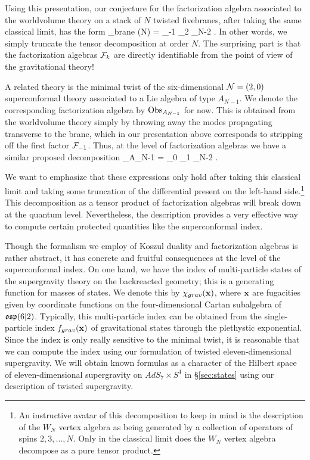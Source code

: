 Using this presentation, our conjecture for the factorization algebra associated to the worldvolume theory on a stack of $N$ twisted fivebranes, after taking the same classical limit, has the form
\beqn\label{eqn:finiteTensor}
\Obs_{brane} (N) = \cF_{-1} \otimes \cF_2 \otimes \cdots \otimes \cF_{N-2} .
\eeqn
In other words, we simply truncate the tensor decomposition at order $N$.
The surprising part is that the factorization algebras $\mathcal F_k$ are directly identifiable from the point of view of the gravitational theory!

A related theory is the minimal twist of the six-dimensional $\mathcal N=(2,0)$ superconformal theory associated to a Lie algebra of type $A_{N-1}$.
We denote the corresponding factorization algebra by $\operatorname{Obs}_{A_{N-1}}$ for now. 
This is obtained from the worldvolume theory simply by throwing away the modes propagating transverse to the brane, which in our presentation above corresponds to stripping off the first factor $\mathcal F_{-1}$. 
Thus, at the level of factorization algebras we have a similar proposed decomposition
\beqn
\Obs_{A_{N-1}} = \cF_0 \otimes \cF_1 \otimes \cdots \otimes \cF_{N-2} .
\eeqn

We want to emphasize that these expressions only hold after taking this classical limit and taking some truncation of the differential present on the left-hand side.\footnote{An instructive avatar of this decomposition to keep in mind is the description of the $W_N$ vertex algebra as being generated by a collection of operators of spins $2,3,\ldots, N$.
Only in the classical limit does the $W_N$ vertex algebra decompose as a pure tensor product.}
This decomposition as a tensor product of factorization algebras will break down at the quantum level.
Nevertheless, the description provides a very effective way to compute certain protected quantities like the superconformal index.

Though the formalism we employ of Koszul duality and factorization algebras is rather abstract, it has concrete and fruitful consequences at the level of the superconformal index.
On one hand, we have the index of multi-particle states of the supergravity theory on the backreacted geometry; this is a generating function for masses of states. We denote this by $\chi_{grav}({\bf x})$, where ${\bf x}$ are fugacities given by coordinate functions on the four-dimensional Cartan subalgebra of~$\mathfrak{osp}(6|2)$.
Typically, this multi-particle index can be obtained from the single-particle index $f_{grav}({\bf x})$ of gravitational states through the plethystic exponential. 
Since the index is only really sensitive to the minimal twist, it is reasonable that we can compute the index using our formulation of twisted eleven-dimensional supergravity.
We will obtain known formulas as a character of the Hilbert space of eleven-dimensional supergravity on $AdS_7\times S^{4}$ in \S\ref{sec:states} using our description of twisted supergravity.

